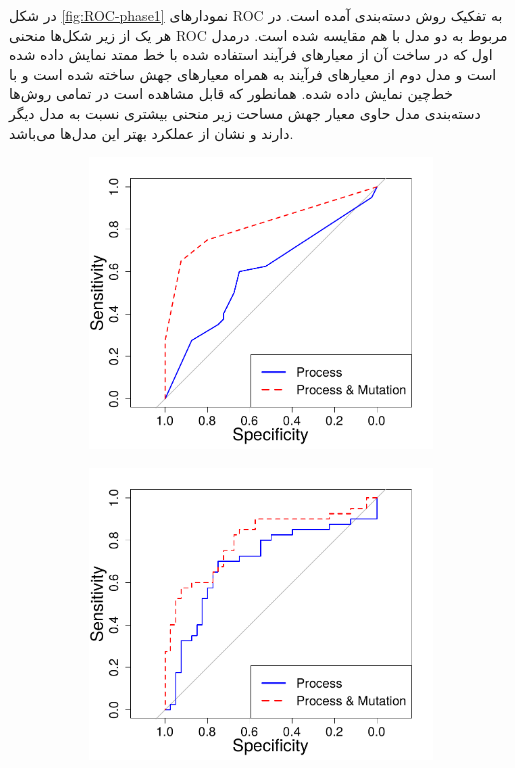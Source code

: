 در شکل \ref{fig:ROC-phase1} نمودارهای ROC به تفکیک روش دسته‌بندی آمده است. در هر یک از زیر شکل‌ها منحنی ROC مربوط به  دو مدل با هم مقایسه شده است. درمدل اول که در ساخت آن از معیارهای فرآیند استفاده شده  با خط ممتد نمایش داده شده است و مدل دوم  از معیارهای فرآیند به همراه معیارهای جهش ساخته شده‌ است  و با خط‌چین نمایش داده شده‌. همانطور که قابل مشاهده است در تمامی روش‌ها دسته‌بندی مدل‌ حاوی معیار جهش مساحت زیر منحنی بیشتری نسبت به مدل دیگر دارند و نشان از عملکرد بهتر این مدل‌ها می‌باشد. 
\begin{figure}[H]
	\begin{subfigure}{.5\textwidth}
		\centering
		\includegraphics[width=\linewidth]{img/evaluation/phase1-roc-dt.pdf}
		\caption{}
	\end{subfigure}
	\begin{subfigure}{.5\textwidth}
	\centering
	\includegraphics[width=\linewidth]{img/evaluation/phase1-roc-svm.pdf}

\end{subfigure}
\end{figure}
